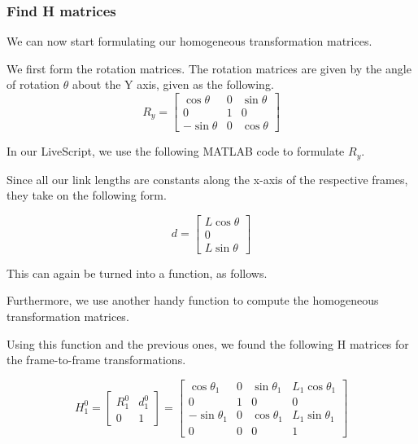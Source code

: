 \documentclass[conference]{IEEEtran}
\begin{document}
\subsubsection{Find H matrices}
We can now start formulating our homogeneous transformation matrices.

We first form the rotation matrices. The rotation matrices are given by
the angle of rotation $\theta$ about the Y axis, given as the following.
\begin{equation*}
    R_y =
    \begin{bmatrix}
         \cos\theta  & 0 & \sin\theta\\
         0 & 1 & 0\\
         -\sin\theta & 0 & \cos\theta
    \end{bmatrix}
\end{equation*}

In our LiveScript, we use the following MATLAB code to formulate $R_y$.



Since all our link lengths are constants along the x-axis of the
respective frames, they take on the following form.

\begin{equation*}
    d = \begin{bmatrix}
        L \cos\theta\\0\\L\sin\theta
    \end{bmatrix}
\end{equation*}

This can again be turned into a function, as follows.



Furthermore, we use another handy function to compute the homogeneous
transformation matrices.



Using this function and the previous ones,
we found the following H matrices for the frame-to-frame transformations.

\[
    H^0_1 = \begin{bmatrix}
        R^0_1 & d^0_1\\
        0 & 1
    \end{bmatrix}
    =
    \begin{bmatrix}
        \cos\theta _{1} & 0 & \sin\theta _{1} & L_{1} \cos\theta_1\\
        0 & 1 & 0 & 0\\
        -\sin\theta _{1} & 0 & \cos\theta_{1} & L_1 \sin\theta_1\\
        0 & 0 & 0 & 1
    \end{bmatrix}
\]
\end{document}
